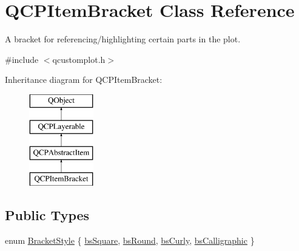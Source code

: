 \hypertarget{class_q_c_p_item_bracket}{}\section{Q\+C\+P\+Item\+Bracket Class Reference}
\label{class_q_c_p_item_bracket}


A bracket for referencing/highlighting certain parts in the plot.  




{\ttfamily \#include $<$qcustomplot.\+h$>$}

Inheritance diagram for Q\+C\+P\+Item\+Bracket\+:\begin{figure}[H]
\begin{center}
\leavevmode
\includegraphics[height=4.000000cm]{d2/d64/class_q_c_p_item_bracket}
\end{center}
\end{figure}
\subsection*{Public Types}
\begin{DoxyCompactItemize}
\item 
enum \mbox{\hyperlink{class_q_c_p_item_bracket_a7ac3afd0b24a607054e7212047d59dbd}{Bracket\+Style}} \{ \mbox{\hyperlink{class_q_c_p_item_bracket_a7ac3afd0b24a607054e7212047d59dbda7f9df4a7359bfe3dac1dbe4ccf5d220c}{bs\+Square}}, 
\mbox{\hyperlink{class_q_c_p_item_bracket_a7ac3afd0b24a607054e7212047d59dbda394627b0830a26ee3e0a02ca67a9f918}{bs\+Round}}, 
\mbox{\hyperlink{class_q_c_p_item_bracket_a7ac3afd0b24a607054e7212047d59dbda5024ce4023c2d8de4221f1cd4816acd8}{bs\+Curly}}, 
\mbox{\hyperlink{class_q_c_p_item_bracket_a7ac3afd0b24a607054e7212047d59dbda8f29f5ef754e2dc9a9efdedb2face0f3}{bs\+Calligraphic}}
 \}
\end{DoxyCompactItemize}
